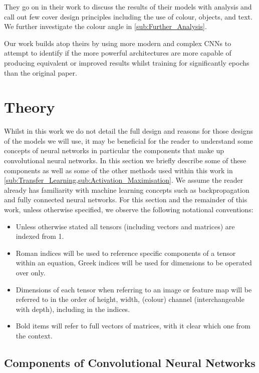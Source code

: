 \documentclass[12pt]{article}
\numberwithin{equation}{section}
\numberwithin{figure}{section}
\begin{document}
They go on in their work to discuss the results of their models with analysis and call out few cover design principles including the use of colour, objects, and text. We further investigate the colour angle in \cref{sub:Further_Analysis}.

Our work builds atop theirs by using more modern and complex CNNs to attempt to identify if the more powerful architectures are more capable of producing equivalent or improved results whilst training for significantly epochs than the original paper.
\section{Theory} 
\label{sec:Theory} 
Whilst in this work we do not detail the full design and reasons for those designs of the models we will use, it may be beneficial for the reader to understand some concepts of neural networks in particular the components that make up convolutional neural networks. In this section we briefly describe some of these components as well as some of the other methods used within this work in \cref{sub:Transfer_Learning,sub:Activation_Maximisation}. We assume the reader already has familiarity with machine learning concepts such as backpropagation and fully connected neural networks. For this section and the remainder of this work, unless otherwise specified, we observe the following notational conventions:
\begin{itemize}
	\item Unless otherwise stated all tensors (including vectors and matrices) are indexed from 1.
	\item Roman indices will be used to reference specific components of a tensor within an equation, Greek indices will be used for dimensions to be operated over only.
	\item Dimensions of each tensor when referring to an image or feature map will be referred to in the order of height, width, (colour) channel (interchangeable with depth), including in the indices.
	\item Bold items will refer to full vectors of matrices, with it clear which one from the context.
\end{itemize}
\subsection{Components of Convolutional Neural Networks} 
\label{sub:Components_of_Convolutional_Neural_Networks} 
\end{document}
